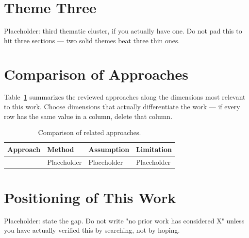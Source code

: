     \section{Theme Three}\label{sec:rw-theme3}
    
        Placeholder: third thematic cluster, if you actually have one. Do not
        pad this to hit three sections — two solid themes beat three thin ones.
    
    \section{Comparison of Approaches} \label{sec:rw-comparison}
    
        Table~\ref{tab:rw-comparison} summarizes the reviewed approaches along
        the dimensions most relevant to this work. Choose dimensions that
        actually differentiate the work — if every row has the same value in
        a column, delete that column.
    
        \begin{table}[H]
            \centering
            \caption{Comparison of related approaches.}
            \label{tab:rw-comparison}
            \begin{tabularx}{\textwidth}{l X X X}
                \toprule
                Approach & Method & Assumption & Limitation \\
                \midrule
                \cite{example2024} & Placeholder & Placeholder & Placeholder \\
                \bottomrule
            \end{tabularx}
        \end{table}

    \section{Positioning of This Work}\label{sec:rw-gap}
    
        
        Placeholder: state the gap. Do not write "no prior work has
        considered X" unless you have actually verified this by searching,
        not by hoping.